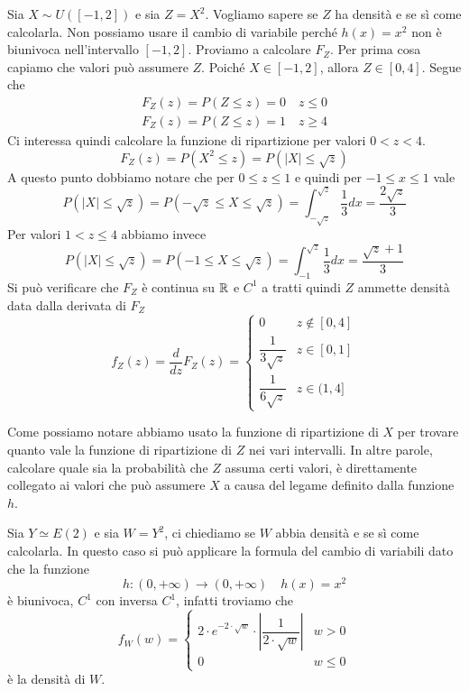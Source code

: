 \begin{example}
	Sia $X \sim U([-1, 2])$ e sia $Z = X^2$. Vogliamo sapere se $Z$ ha densità e se sì come
	calcolarla. Non possiamo usare il cambio di variabile perché $h(x) = x^2$ non è biunivoca
	nell'intervallo $[-1,2]$. Proviamo a calcolare $F_Z$. Per prima cosa capiamo che valori può
	assumere $Z$. Poiché $X \in [-1, 2]$, allora $Z \in [0,4]$. Segue che
	\begin{gather*}
		F_Z(z) = P(Z \leq z) = 0 \quad z \leq 0 \\
		F_Z(z) = P(Z \leq z) = 1 \quad z \geq 4
	\end{gather*}
	Ci interessa quindi calcolare la funzione di ripartizione per valori $0 < z < 4$.
	\[ F_Z(z) = P(X^2 \leq z) = P(|X| \leq \sqrt{z}) \]
	A questo punto dobbiamo notare che per $0 \leq z \leq 1$ e quindi per $-1 \leq x \leq 1$ vale
	\[
		P(|X| \leq \sqrt{z}) = P(-\sqrt{z} \leq X \leq \sqrt{z}) =
		\int_{-\sqrt{z}}^{\sqrt{z}} \frac{1}{3} dx = \frac{2 \sqrt{z}}{3}
	\]
	Per valori $1 < z \leq 4$ abbiamo invece
	\[
		P(|X| \leq \sqrt{z}) = P(-1 \leq X \leq \sqrt{z}) =
		\int_{-1}^{\sqrt{z}} \frac{1}{3} dx = \frac{\sqrt{z} + 1}{3}
	\]
	Si può verificare che $F_Z$ è continua su $\mathbb{R}$ e $C^1$ a tratti quindi $Z$ ammette densità data
	dalla derivata di $F_Z$
	\[
		f_Z (z) = \frac{d}{dz} F_Z(z) = \begin{cases}
			0                     & z \notin [0,4] \\[1ex]
			\dfrac{1}{3 \sqrt{z}} & z \in [0,1]    \\[2ex]
			\dfrac{1}{6 \sqrt{z}} & z \in (1, 4]
		\end{cases}
	\]
\end{example}

Come possiamo notare abbiamo usato la funzione di ripartizione di $X$ per trovare quanto vale la
funzione di ripartizione di $Z$ nei vari intervalli. In altre parole, calcolare quale sia la
probabilità che $Z$ assuma certi valori, è direttamente collegato ai valori che può assumere $X$
a causa del legame definito dalla funzione $h$.

\begin{example}
	Sia $Y \simeq E(2)$ e sia $W = Y^2$, ci chiediamo se $W$ abbia densità e se sì come calcolarla.
	In questo caso si può applicare la formula del cambio di variabili dato che la funzione
	\[ h : (0, +\infty) \to (0, +\infty) \quad h(x) = x^2 \]
	è biunivoca, $C^1$ con inversa $C^1$, infatti troviamo che
	\[
		f_W(w) = \begin{cases}
			2 \cdot e^{-2 \cdot \sqrt{w}} \cdot
			\left| \dfrac{1}{2 \cdot \sqrt{w}} \right| & w > 0    \\
			0                                          & w \leq 0
		\end{cases}
	\]
	è la densità di $W$.
\end{example}

